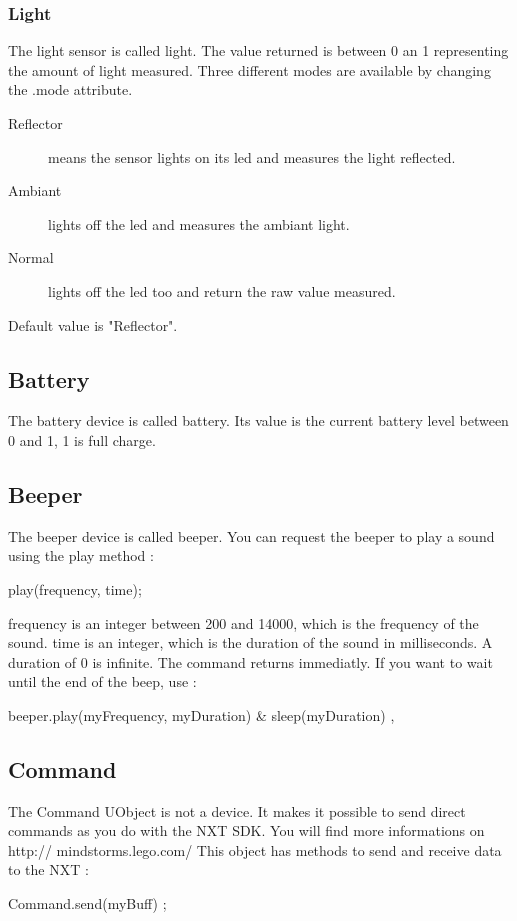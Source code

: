 \subsubsection{Light}
The light sensor is called light.
The value returned is between 0 an 1 representing the amount of light measured.
Three different modes are available by changing the .mode attribute.
\begin{description}
\item[Reflector] means the sensor lights on its led and measures the light
  reflected.
\item[Ambiant] lights off the led and measures the ambiant light.
\item[Normal] lights off the led too and return the raw value measured.
\end{description}
Default value is "Reflector".

\subsection{Battery}
The battery device is called battery.
Its value is the current battery level between 0 and 1, 1 is full charge.
\subsection{Beeper}
The beeper device is called beeper.
You can request the beeper to play a sound using the play method :
\begin{urbiunchecked}
  play(frequency, time);
\end{urbiunchecked}

frequency is an integer between 200 and 14000, which is the frequency of the
sound. time is an integer, which is the duration of the sound in milliseconds.
A duration of 0 is infinite.
The command returns immediatly. If you want to wait until the end of the beep,
use :
\begin{urbiunchecked}
  { beeper.play(myFrequency, myDuration) & sleep(myDuration) },
\end{urbiunchecked}

\subsection{Command}
The Command UObject is not a device. It makes it possible to send direct
commands as you do with the NXT SDK. You will find more informations on http://
mindstorms.lego.com/
This object has methods to send and receive data to the NXT :
\begin{urbiunchecked}
  Command.send(myBuff) ;
\end{urbiunchecked}

